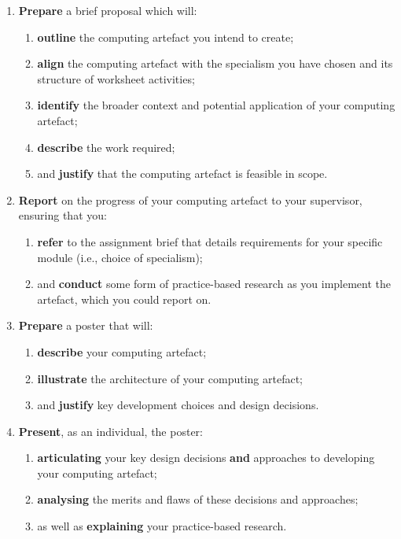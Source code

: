 \documentclass{../../fal_assignment}
\begin{document}
\begin{enumerate}[label=(\Alph*)]
	\item \textbf{Prepare} a brief proposal which will:
		\begin{enumerate}[label=(\roman*)]
			\item \textbf{outline} the computing artefact you intend to create;
			\item \textbf{align} the computing artefact with the specialism you have chosen and its structure of worksheet activities;
			\item \textbf{identify} the broader context and potential application of your computing artefact;
			\item \textbf{describe} the work required;
			\item and \textbf{justify} that the computing artefact is feasible in scope.
		\end{enumerate}
	\item \textbf{Report} on the progress of your computing artefact to your supervisor, ensuring that you:
		\begin{enumerate}[label=(\roman*)]
			\item \textbf{refer} to the assignment brief that details requirements for your specific module (i.e., choice of specialism);
			\item and \textbf{conduct} some form of practice-based research as you implement the artefact, which you could report on.
		\end{enumerate}
	\item \textbf{Prepare} a poster that will:
		\begin{enumerate}[label=(\roman*)]
			\item \textbf{describe} your computing artefact;
			\item \textbf{illustrate} the architecture of your computing artefact;
			\item and \textbf{justify} key development choices and design decisions.
		\end{enumerate}
	\item \textbf{Present}, as an individual, the poster:
		\begin{enumerate}[label=(\roman*)]
			\item \textbf{articulating} your key design decisions \textbf{and} approaches to developing your computing artefact;
			\item \textbf{analysing} the merits and flaws of these decisions and approaches;
			\item as well as \textbf{explaining} your practice-based research.
		\end{enumerate}	
\end{enumerate}
\end{document}
